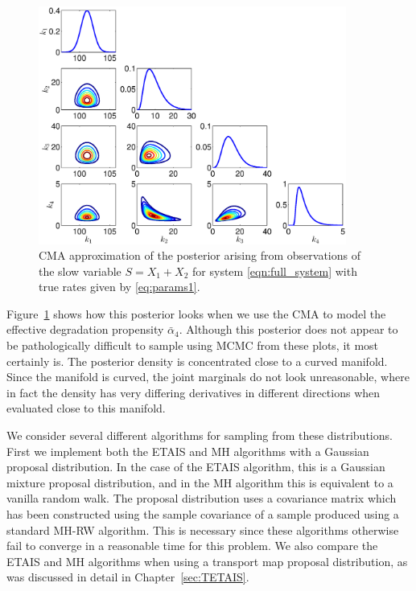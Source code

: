 \documentclass[final]{siamltex}
\providecommand{\DIFdelbeginFL}{} %
\providecommand{\DIFdelendFL}{} %
\newcommand{\DIFscaledelfig}{0.5}
\newlength{\DIFdelgraphicswidth} %
\newlength{\DIFdelgraphicsheight} %
\newcommand{\DIFdelincludegraphics}[2][]{%
\sbox{\DIFdelgraphicsbox}{\DIFOincludegraphics[#1]{#2}}%
\settoboxwidth{\DIFdelgraphicswidth}{\DIFdelgraphicsbox} %
\settoboxtotalheight{\DIFdelgraphicsheight}{\DIFdelgraphicsbox} %
\scalebox{\DIFscaledelfig}{%
\parbox[b]{\DIFdelgraphicswidth}{\usebox{\DIFdelgraphicsbox}\\[-\baselineskip] \rule{\DIFdelgraphicswidth}{0em}}\llap{\resizebox{\DIFdelgraphicswidth}{\DIFdelgraphicsheight}{%
\setlength{\unitlength}{\DIFdelgraphicswidth}%
\begin{picture}(1,1)%
\thicklines\linethickness{2pt} %
{\color[rgb]{1,0,0}\put(0,0){\framebox(1,1){}}}%
{\color[rgb]{1,0,0}\put(0,0){\line( 1,1){1}}}%
{\color[rgb]{1,0,0}\put(0,1){\line(1,-1){1}}}%
\end{picture}%
}\hspace*{3pt}}} %
} %
\DeclareRobustCommand{\DIFdelbeginFL}{\DIFOdelbeginFL \let\includegraphics\DIFdelincludegraphics} %
\DeclareRobustCommand{\DIFdelendFL}{\DIFOaddendFL \let\includegraphics\DIFOincludegraphics} %
\begin{document}
\begin{figure}[htb]
\centering
\includegraphics[width=0.9\textwidth]{"images/Applications/CMA_posterior"}
\caption{CMA approximation \DIFdelbeginFL %
\DIFdelendFL of the posterior arising from observations of
  the slow variable $S = X_1 + X_2$ for system
  \eqref{eqn:full_system}  with true rates given by \eqref{eq:params1}.}
\label{fig:chem_CMA_posterior}
\end{figure}

Figure~\ref{fig:chem_CMA_posterior} shows how this posterior looks
when we use the CMA to model the effective degradation propensity
$\bar{\alpha}_4$. Although this posterior does not appear to be
pathologically difficult to sample using MCMC from these plots, it most certainly is. The posterior
density is concentrated close to a curved manifold. Since the manifold
is curved, the joint marginals do not look unreasonable, where in fact
the density has very differing derivatives in different directions
when evaluated close to this manifold.

We consider several different algorithms for sampling from these
distributions. First we implement both the ETAIS and MH algorithms with
a Gaussian proposal distribution. In the case of the ETAIS algorithm,
this is a Gaussian mixture proposal distribution, and in the MH
algorithm this is equivalent to a vanilla random walk. The proposal
distribution uses a covariance matrix which has been constructed using
the sample covariance of a sample produced using a standard MH-RW
algorithm. This is necessary since these algorithms otherwise fail to
converge in a reasonable time for
this problem. We also compare the ETAIS and MH algorithms when using a
transport map proposal distribution, as was discussed in detail in Chapter~\ref{sec:TETAIS}.
\end{document}
